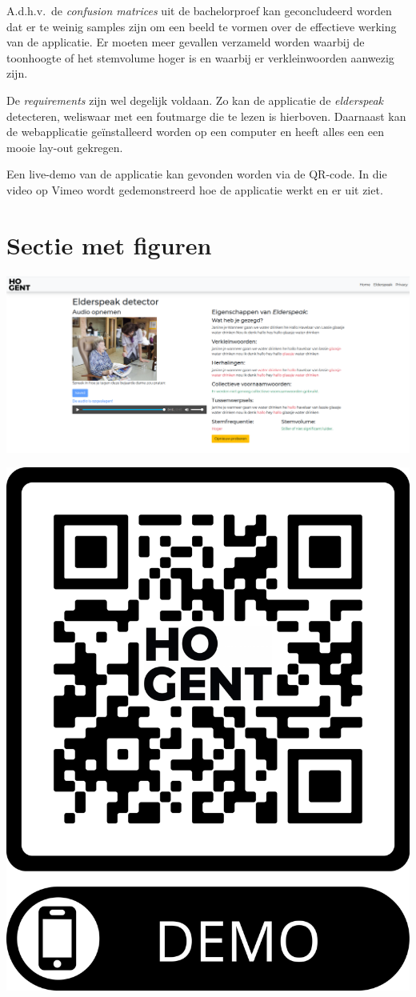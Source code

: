 \documentclass[a0,portrait]{a0poster}
\begin{document}
\begin{multicols}{2}
A.d.h.v.\ de \textit{confusion matrices} uit de bachelorproef kan geconcludeerd worden dat er te weinig samples zijn om een beeld te vormen over de effectieve werking van de applicatie. Er moeten meer gevallen verzameld worden waarbij de toonhoogte of het stemvolume hoger is en waarbij er verkleinwoorden aanwezig zijn.

De \textit{requirements} zijn wel degelijk voldaan. Zo kan de applicatie de \textit{elderspeak} detecteren, weliswaar met een foutmarge die te lezen is hierboven. Daarnaast kan de webapplicatie geïnstalleerd worden op een computer en heeft alles een een mooie lay-out gekregen.

Een live-demo van de applicatie kan gevonden worden via de QR-code. In die video op Vimeo wordt gedemonstreerd hoe de applicatie werkt en er uit ziet.

\color{HoGentAccent1}
\section*{Sectie met figuren}
\color{black}

\begin{center}\vspace{1cm}
    \includegraphics[width=1.0\linewidth]{dector_na_detecteren}
\end{center}\vspace{1cm}

\begin{center}\vspace{1cm}
    \includegraphics[width=0.25\linewidth]{qr}
\end{center}\vspace{1cm}



\end{multicols}
\end{document}
